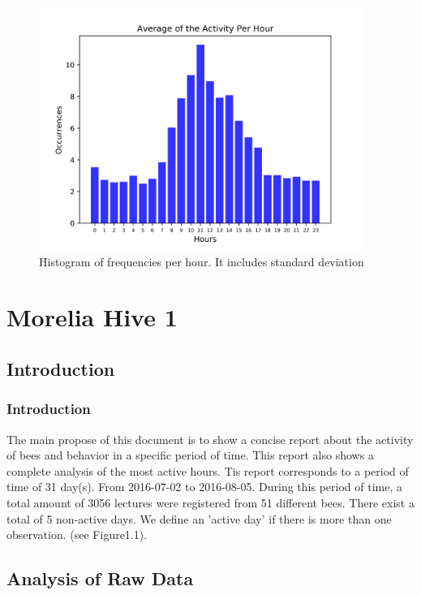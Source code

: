 \documentclass[11pt,fleqn]{book} %
\begin{document}
%


\begin{figure}[h!]%
\centering%
\includegraphics[width=400px]{Pictures/Morelia Hive 2histogramClean.png}%
\caption{Histogram of frequencies per hour. It includes standard deviation}%
\end{figure}

\part{Morelia Hive 1}
\chapter{Introduction} 
\normalsize%
\section{Introduction}%
\label{sec:Introduction}%
The main propose of this document  is to show a concise report about the activity of bees and behavior in a specific period of time. This report also shows a complete analysis of the most active hours.\newline%
\newline%
Tis report corresponds to a period of time of 31 day(s). From 2016{-}07{-}02 to 2016{-}08{-}05. During this period of time, a total amount of 3056 lectures were registered from 51 different bees. There exist a total of 5 non{-}active days. We define an 'active day' if there is more than one observation. (see Figure1.1).\newline%
\newline%

\chapter{Analysis of Raw Data} 
\normalsize%
\end{document}
